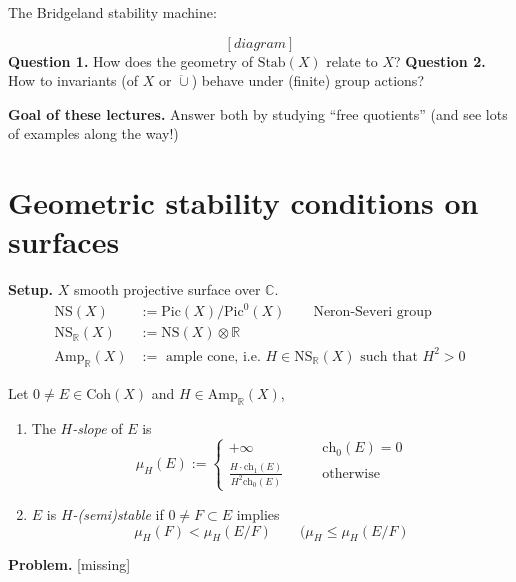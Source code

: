 The Bridgeland stability machine:

$$
[diagram]
$$
\noindent
{\bf Question 1.} How does the geometry of $\text{Stab}(X)$ relate to $X$?
\noindent
{\bf Question 2.} How to invariants (of $X$ or $\ddot\cup $) behave under (finite) 
group actions?

\medskip\noindent
{\bf Goal of these lectures.} Answer both by studying ``free quotients'' (and
see lots of examples along the way!)

\section{Geometric stability conditions on surfaces}
\label{section-geometric-stability-conditions-on-surfaces}
\noindent
{\bf Setup.} $X$ smooth projective surface over $\mathbb{C}$.
\begin{align*}
\text{NS}(X)&:=\text{Pic}(X)/\text{Pic}^0(X)\qquad \text{Neron-Severi group}\\
\text{NS}_{\mathbb{R}}(X)& :=\text{NS}(X) \otimes \mathbb{R}\\
\text{Amp}_{\mathbb{R}}(X)&:=\text{ ample cone, i.e. $H \in
\text{NS}_{\mathbb{R}}(X)$ such that $H^2>0$}
\end{align*}

\begin{definition}
\label{definition-slope-and-stability}
Let $0 \neq  E \in \text{Coh}(X)$ and $H \in \text{Amp}_{\mathbb{R}}(X)$,
\begin{enumerate}
\item The {\it $H$-slope} of $E$ is
$$
\mu_H(E):=
\begin{cases}
+\infty\qquad &\text{ch}_0(E)=0 \\
\frac{H\cdot \text{ch}_1(E)}{H^2 \text{ch}_0(E)}\qquad &\text{otherwise}
\end{cases}
$$
\item $E$ is {\it $H$-(semi)stable} if $0 \neq  F \subset E$ implies
$$
\mu_H(F) < \mu_H(E/F)\qquad (\mu_H\leq \mu_H(E/F)
$$
\end{enumerate}
\end{definition}

\begin{example}
\label{example-semistable-condition}

\end{example}

\noindent
{\bf Problem.} [missing]

